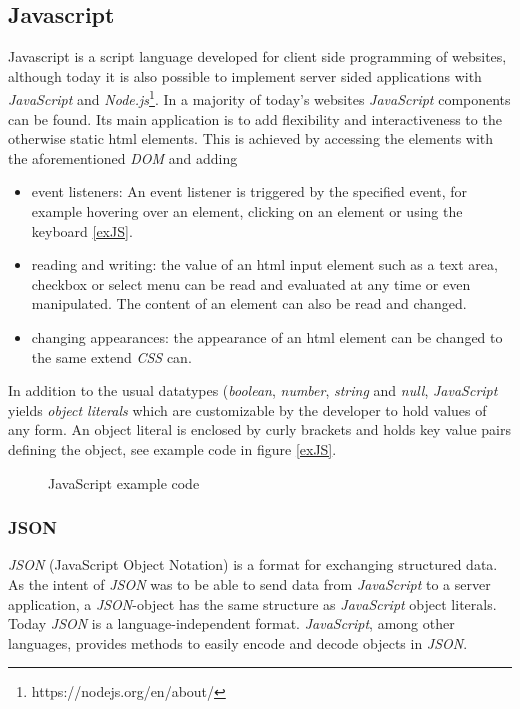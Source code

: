 \subsection{Javascript}
Javascript is a script language developed for client side programming of websites, although today it is also possible to implement server sided applications with \textit{JavaScript} and \textit{Node.js}\footnote{https://nodejs.org/en/about/}. In a majority of today's websites \textit{JavaScript} components can be found. Its main application is to add flexibility and interactiveness to the otherwise static html elements. This is achieved by accessing the elements with the aforementioned \textit{DOM} and adding 
\begin{itemize}
\item event listeners: An event listener is triggered by the specified event, for example hovering over an element, clicking on an element or using the keyboard \autoref{exJS}.
\item reading and writing: the value of an html input element such as a text area, checkbox or select menu can be read and evaluated at any time or even manipulated. The content of an element can also be read and changed.
\item changing appearances: the appearance of an html element can be changed to the same extend \textit{CSS} can.
\end{itemize}
In addition to the usual datatypes (\textit{boolean}, \textit{number}, \textit{string} and \textit{null}, \textit{JavaScript} yields \textit{object literals} which are customizable by the developer to hold values of any form. An object literal is enclosed by curly brackets and holds key value pairs defining the object, see example code in figure \autoref{exJS}.

\begin{figure}[!h]

\caption{JavaScript example code}
\label{exJS}
\end{figure}

\subsubsection{JSON} 
\textit{JSON} (JavaScript Object Notation) is a format for exchanging structured data. As the intent of \textit{JSON} was to be able to send data from \textit{JavaScript} to a server application, a \textit{JSON}-object has the same structure as \textit{JavaScript} object literals. Today \textit{JSON} is a language-independent format. \textit{JavaScript}, among other languages, provides methods to easily encode and decode objects in \textit{JSON}.

